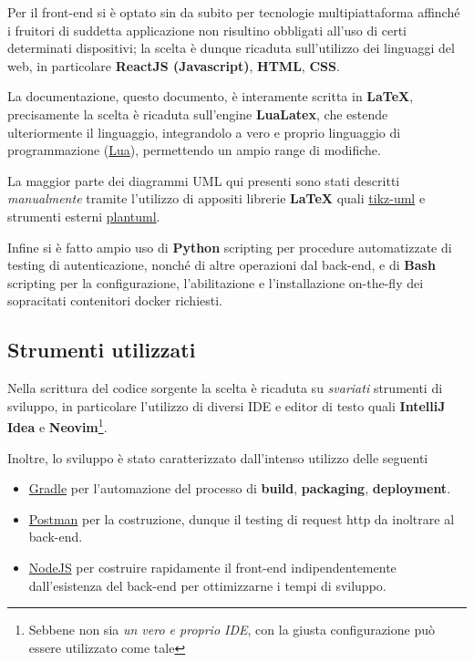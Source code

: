 
	Per il front-end si è optato sin da subito per tecnologie multipiattaforma affinché i fruitori di suddetta applicazione non risultino obbligati all'uso
	di certi determinati dispositivi; la scelta è dunque ricaduta sull'utilizzo dei linguaggi del web, in particolare \textbf{ReactJS (Javascript)}, \textbf{HTML}, \textbf{CSS}.

	La documentazione, questo documento, è interamente scritta in \textbf{LaTeX}, precisamente la scelta è ricaduta sull'engine \textbf{LuaLatex}, che estende
	ulteriormente il linguaggio, integrandolo a vero e proprio linguaggio di programmazione (\href{https://www.lua.org/}{Lua}), permettendo un ampio range di modifiche.

	La maggior parte dei diagrammi UML qui presenti sono stati descritti \textit{manualmente} tramite l'utilizzo di appositi librerie \textbf{\LaTeX}
	quali \href{https://perso.ensta-paris.fr/~kielbasi/tikzuml/index.php}{tikz-uml} e strumenti esterni \href{https://plantuml.com/}{plantuml}.

	Infine si è fatto ampio uso di \textbf{Python} scripting per procedure automatizzate di testing di autenticazione, nonché di
	altre operazioni dal back-end, e di \textbf{Bash} scripting per la configurazione, l'abilitazione e l'installazione on-the-fly dei sopracitati contenitori 
	docker richiesti.

	\subsection{Strumenti utilizzati}
	Nella scrittura del codice sorgente la scelta è ricaduta su \textit{svariati} strumenti di sviluppo, in particolare l'utilizzo di diversi
	IDE
	e editor di testo quali \textbf{IntelliJ Idea} e \textbf{Neovim}\footnote{Sebbene non sia \textit{un vero e proprio IDE}, con la giusta configurazione può essere utilizzato come tale}.
	
	Inoltre, lo sviluppo è stato caratterizzato dall'intenso utilizzo delle seguenti
	\begin{itemize}
		\item \href{https://gradle.org/}{Gradle} per l'automazione del processo di \textbf{build}, \textbf{packaging}, \textbf{deployment}.
		\item \href{https://www.postman.com/}{Postman} per la costruzione, dunque il testing di request http da inoltrare al back-end.
		\item \href{https://nodejs.org/en/}{NodeJS} per costruire rapidamente il front-end indipendentemente dall'esistenza del back-end per ottimizzarne i tempi di sviluppo.
	\end{itemize}

